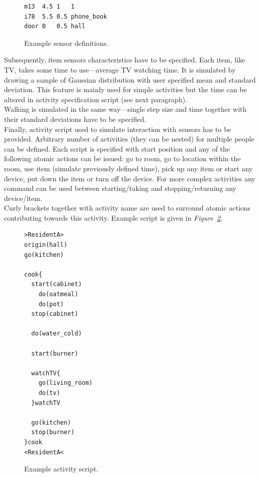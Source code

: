 \documentclass[11pt, a4paper, pdflatex, leqno, twoside, openright]{report}
\begin{document}
\begin{figure}[htb]
  \begin{lstlisting}
m13  4.5 1   1
i78  5.5 0.5 phone_book
door 0   0.5 hall
  \end{lstlisting}
  \caption{Example sensor definitions.\label{lst:sensorLayout}}
\end{figure}

Subsequently, item sensors characteristics have to be specified. Each item, like TV, takes some time to use---average TV watching time. It is simulated by drawing a sample of Gaussian distribution with user specified mean and standard deviation. This feature is mainly used for simple activities but the time can be altered in activity specification script (see next paragraph).\\
Walking is simulated in the same way---single step size and time together with their standard deviations have to be specified.\\

Finally, activity script used to simulate interaction with sensors has to be provided. Arbitrary number of activities (they can be nested) for multiple people can be defined. Each script is specified with start position and any of the following atomic actions can be issued: go to room, go to location within the room, use item (simulate previously defined time), pick up any item or start any device, put down the item or turn off the device. For more complex activities any command can be used between starting/taking and stopping/returning any device/item.\\
Curly brackets together with activity name are used to surround atomic actions contributing towards this activity. Example script is given in \emph{Figure~\ref{lst:path}}.\\

\begin{figure}[htb]
  \begin{lstlisting}
>ResidentA>
origin(hall)
go(kitchen)

cook{
  start(cabinet)
    do(oatmeal)
    do(pot)
  stop(cabinet)

  do(water_cold)

  start(burner)

  watchTV{
    go(living_room)
    do(tv)
  }watchTV

  go(kitchen)
  stop(burner)
}cook
<ResidentA<
  \end{lstlisting}
  \caption{Example activity script.\label{lst:path}}
\end{figure}
\end{document}
